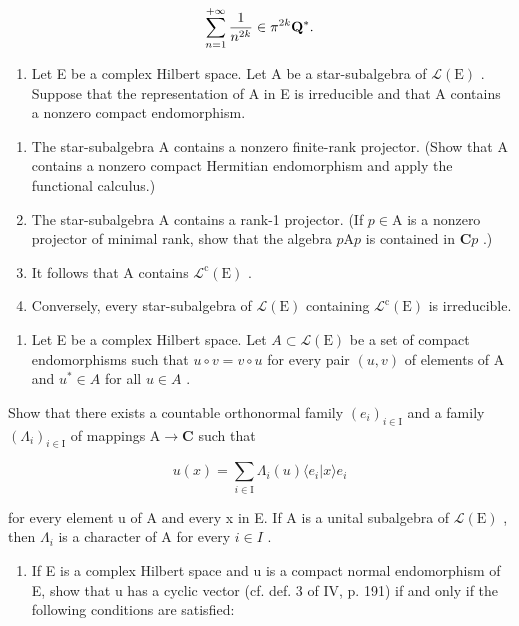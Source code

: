 \[
\sum_ {n = 1} ^ {+ \infty} \frac {1}{n ^ {2 k}} \in \pi^ {2 k} {\bf Q} ^ {*}.
\]

\begin{enumerate}
\def\labelenumi{\arabic{enumi})}
\setcounter{enumi}{9}
\tightlist
\item
  Let E be a complex Hilbert space. Let A be a star-subalgebra of \(\mathcal{L}(\mathrm{E})\) . Suppose that the representation of A in E is irreducible and that A contains a nonzero compact endomorphism.
\end{enumerate}

\begin{enumerate}
\def\labelenumi{\alph{enumi})}
\item
  The star-subalgebra A contains a nonzero finite-rank projector. (Show that A contains a nonzero compact Hermitian endomorphism and apply the functional calculus.)
\item
  The star-subalgebra A contains a rank-1 projector. (If \(p \in \mathrm{A}\) is a nonzero projector of minimal rank, show that the algebra \(p\mathrm{A}p\) is contained in \(\mathbf{C}p\) .)
\item
  It follows that A contains \(\mathcal{L}^{\mathrm{c}}(\mathrm{E})\) .
\item
  Conversely, every star-subalgebra of \(\mathcal{L}(\mathrm{E})\) containing \(\mathcal{L}^{\mathrm{c}}(\mathrm{E})\) is irreducible.
\end{enumerate}

\begin{enumerate}
\def\labelenumi{\arabic{enumi})}
\setcounter{enumi}{10}
\tightlist
\item
  Let E be a complex Hilbert space. Let \(A \subset \mathcal{L}(\mathrm{E})\) be a set of compact endomorphisms such that \(u \circ v = v \circ u\) for every pair \((u, v)\) of elements of A and \(u^{*} \in A\) for all \(u \in A\) .
\end{enumerate}

Show that there exists a countable orthonormal family \((e_i)_{i\in \mathrm{I}}\) and a family \((\Lambda_i)_{i\in \mathrm{I}}\) of mappings \(\mathrm{A}\to \mathbf{C}\) such that

\[
u (x) = \sum_ {i \in \mathrm{I}} \Lambda_ {i} (u) \langle e _ {i} | x \rangle e _ {i}
\]

for every element u of A and every x in E. If A is a unital subalgebra of \(\mathcal{L}(\mathrm{E})\) , then \(\Lambda_{i}\) is a character of A for every \(i \in I\) .

\begin{enumerate}
\def\labelenumi{\arabic{enumi})}
\setcounter{enumi}{11}
\tightlist
\item
  If E is a complex Hilbert space and u is a compact normal endomorphism of E, show that u has a cyclic vector (cf. def. 3 of IV, p. 191) if and only if the following conditions are satisfied:
\end{enumerate}

